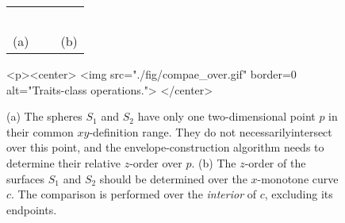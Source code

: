 \begin{figure}[t]
\begin{ccTexOnly}
  \begin{center}
  \begin{tabular}{ccc}
     & ~ &
     \\
    {\small (a)} & ~ & {\small (b)}
  \end{tabular}
  \end{center}
\end{ccTexOnly}
\begin{ccHtmlOnly}
  <p><center>
  <img src="./fig/compae_over.gif" border=0 alt="Traits-class operations.">
  </center>
\end{ccHtmlOnly}
\caption{(a) The spheres $S_1$ and $S_2$ have only one
two-dimensional point $p$ in their common $xy$-definition range. They
do not necessarilyintersect over this point, and the
envelope-construction algorithm needs to determine their relative
$z$-order over $p$. (b) The $z$-order of the surfaces $S_1$ and $S_2$
should be determined over the $x$-monotone curve $c$. The comparison
is performed over the {\em interior} of $c$, excluding its
endpoints.\label{env3_fig:comp_over}}
\end{figure}

